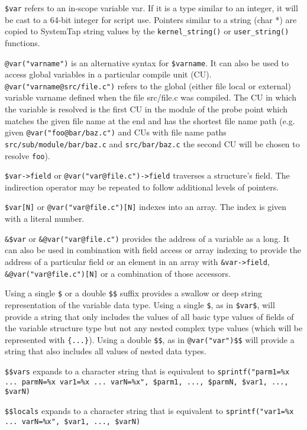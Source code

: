 \documentclass[twoside,english]{article}
\begin{document}
\texttt{\$var} refers to an in-scope variable var. If it is a type similar
to an integer, it will be cast to a 64-bit integer for script use. Pointers
similar to a string (char {*}) are copied to SystemTap string values by the
\texttt{kernel\_string()} or \texttt{user\_string()} functions.

\texttt{@var("varname")} is an alternative syntax for \texttt{\$varname}.
It can also be used to access global variables in a particular compile
unit (CU).  \texttt{@var("varname@src/file.c")} refers to the global
(either file local or external) variable varname defined when the file
src/file.c was compiled. The CU in which the variable is resolved is
the first CU in the module of the probe point which matches the given
file name at the end and has the shortest file name path (e.g. given
\texttt{@var("foo@bar/baz.c")} and CUs with file name paths
\texttt{src/sub/module/bar/baz.c} and \texttt{src/bar/baz.c} the second
CU will be chosen to resolve \texttt{foo}).

\texttt{\$var->field} or \texttt{@var("var@file.c")->field} traverses a
structure's field. The indirection operator may be repeated to follow
additional levels of pointers.

\texttt{\$var{[}N]} or \texttt{@var("var@file.c"){[}N]} indexes into an
array. The index is given with a literal number.

\texttt{\&\$var} or \texttt{\&@var("var@file.c")} provides the address of
a variable as a long. It can also be used in combination with field access
or array indexing to provide the address of a particular field or an
element in an array with \texttt{\&var->field},
\texttt{\&@var("var@file.c"){[}N]} or a combination of those accessors.

Using a single \texttt{\$} or a double \texttt{\$\$} suffix provides a
swallow or deep string representation of the variable data type. Using
a single \texttt{\$}, as in \texttt{\$var\$}, will provide a string that
only includes the values of all basic type values of fields of the variable
structure type but not any nested complex type values (which will be
represented with \texttt{\{...\}}). Using a double \texttt{\$\$},
as in \texttt{@var("var")\$\$} will provide a string that also includes
all values of nested data types.

\texttt{\$\$vars} expands to a character string that is equivalent to
\texttt{sprintf("parm1=\%x ... parmN=\%x var1=\%x ... varN=\%x", \$parm1, ..., \$parmN,
\$var1, ..., \$varN)}

\texttt{\$\$locals} expands to a character string that is equivalent to
\texttt{sprintf("var1=\%x ... varN=\%x", \$var1, ..., \$varN)}
\end{document}
